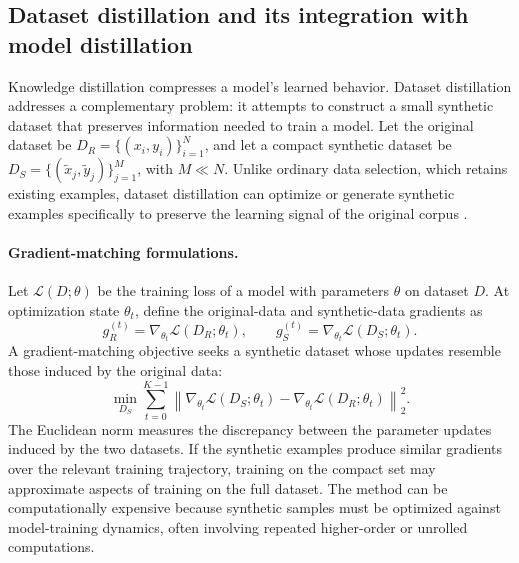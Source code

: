 \subsection{Dataset distillation and its integration with model distillation}
\label{subsec:distillation-dataset-distillation}

Knowledge distillation compresses a model's learned behavior.  Dataset
distillation addresses a complementary problem: it attempts to construct a
small synthetic dataset that preserves information needed to train a model.
Let the original dataset be
\(D_R=\{(x_i,y_i)\}_{i=1}^{N}\), and let a compact synthetic dataset be
\(D_S=\{(\widetilde x_j,\widetilde y_j)\}_{j=1}^{M}\), with
\(M\ll N\).  Unlike ordinary data selection, which retains existing
examples, dataset distillation can optimize or generate synthetic examples
specifically to preserve the learning signal of the original corpus
\parencite{Fang2026KnowledgeDatasetDistillation}.

\paragraph{Gradient-matching formulations.}
Let \(\mathcal L(D;\theta)\) be the training loss of a model with
parameters \(\theta\) on dataset \(D\).  At optimization state
\(\theta_t\), define the original-data and synthetic-data gradients as
\begin{equation}
    g_R^{(t)}=\nabla_{\theta_t}\mathcal L(D_R;\theta_t),
    \qquad
    g_S^{(t)}=\nabla_{\theta_t}\mathcal L(D_S;\theta_t).
    \label{eq:distillation-dataset-gradients}
\end{equation}
A gradient-matching objective seeks a synthetic dataset whose updates
resemble those induced by the original data:
\begin{equation}
    \min_{D_S}
    \sum_{t=0}^{K-1}
    \left\|
      \nabla_{\theta_t}\mathcal L(D_S;\theta_t)
      -\nabla_{\theta_t}\mathcal L(D_R;\theta_t)
    \right\|_2^2.
    \label{eq:distillation-gradient-matching}
\end{equation}
The Euclidean norm measures the discrepancy between the parameter updates
induced by the two datasets.  If the synthetic examples produce similar
gradients over the relevant training trajectory, training on the compact
set may approximate aspects of training on the full dataset.  The method
can be computationally expensive because synthetic samples must be
optimized against model-training dynamics, often involving repeated
higher-order or unrolled computations.

